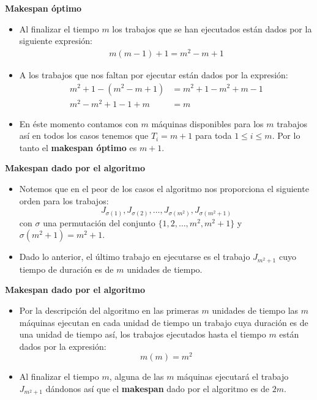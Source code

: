 \begin{frame}{\subsectiontitle}
    \textbf{Makespan óptimo}
    \begin{itemize}
        \item Al finalizar el tiempo \(m\) los trabajos que se han ejecutados están dados por la siguiente expresión:
        \begin{align*}
            m(m-1) + 1 = m^2 - m + 1
        \end{align*}
        \item A los trabajos que nos faltan por ejecutar están dados por la expresión:
        \begin{align*}
            m^2 + 1 - ( m^2 - m + 1) &= m^2 + 1 - m^2 + m - 1 \\
            m^2 - m^2 + 1 - 1 + m &= m
        \end{align*}
        \item En éste momento contamos con \(m\) máquinas disponibles para los \(m\) trabajos así en todos los casos tenemos que \(T_{i} = m + 1\) para toda \(1 \leq i \leq m\). Por lo tanto el \textbf{makespan óptimo} es \(m + 1\).
    \end{itemize}
\end{frame}

\begin{frame}{\subsectiontitle}
    \textbf{Makespan dado por el algoritmo}
    \begin{itemize}
        \item Notemos que en el peor de los casos el algoritmo nos proporciona el siguiente orden para los trabajos:
        \[
            J_{\sigma\left(1\right)}, J_{\sigma\left(2\right)}, \dotsc, J_{\sigma\left(m^2\right)}, J_{\sigma\left(m^2+1\right)}
        \]
        con \(\sigma\) una permutación del conjunto \(\{1, 2, \dotsc, m^2, m^2 + 1\}\) y \(\sigma\left(m^2+1\right) = m^2+1\).
        \item Dado lo anterior, el último trabajo en ejecutarse es el trabajo \(J_{m^2+1}\) cuyo tiempo de duración es de \(m\) unidades de tiempo.
    \end{itemize}
\end{frame}

\begin{frame}{\subsectiontitle}
    \textbf{Makespan dado por el algoritmo}
    \begin{itemize}
        \item Por la descripción del algoritmo en las primeras \(m\) unidades de tiempo las \(m\) máquinas ejecutan en cada unidad de tiempo un trabajo cuya duración es de una unidad de tiempo así, los trabajos ejecutados hasta el tiempo \(m\) están dados por la expresión:
        \[
            m(m) = m^2  
        \]
        \item Al finalizar el tiempo \(m\), alguna de las \(m\) máquinas ejecutará el trabajo \(J_{m^2+1}\) dándonos así que el \textbf{makespan} dado por el algoritmo es de \(2m\).
    \end{itemize}
\end{frame}

